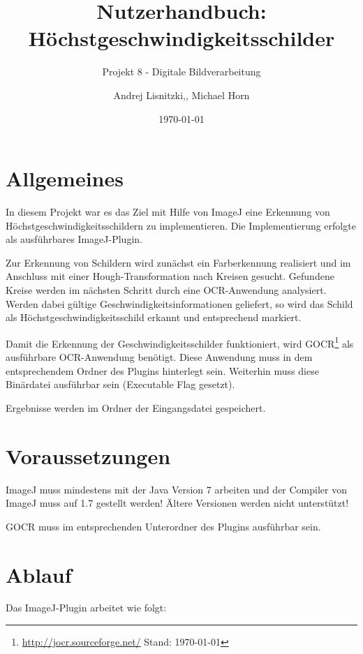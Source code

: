 						

\title{Nutzerhandbuch:  Höchstgeschwindigkeitsschilder}
\subtitle{Projekt 8 - Digitale Bildverarbeitung}

\author{Andrej Lisnitzki,, Michael Horn\vspace{4cm}}
\date{\today}

\maketitle

\section{Allgemeines}
In diesem Projekt war es das Ziel mit Hilfe von ImageJ eine Erkennung von Höchstgeschwindigkeitsschildern zu implementieren.
Die Implementierung erfolgte als ausführbares ImageJ-Plugin.

Zur Erkennung von Schildern wird zunächst ein Farberkennung realisiert und im Anschluss mit einer Hough-Transformation nach Kreisen gesucht.
Gefundene Kreise werden im nächsten Schritt durch eine OCR-Anwendung analysiert.
Werden dabei gültige Geschwindigkeitsinformationen geliefert, so wird das Schild als Höchstgeschwindigkeitsschild erkannt und entsprechend markiert.

Damit die Erkennung der Geschwindigkeitsschilder funktioniert, wird GOCR\footnote{\url{http://jocr.sourceforge.net/} Stand: \today} als ausführbare OCR-Anwendung benötigt.
Diese Anwendung muss in dem entsprechendem Ordner des Plugins hinterlegt sein.
Weiterhin muss diese Binärdatei ausführbar sein (Executable Flag gesetzt).

Ergebnisse werden im Ordner der Eingangsdatei gespeichert.

\pagebreak
\section{Voraussetzungen}
ImageJ muss mindestens mit der Java Version 7 arbeiten und der Compiler von ImageJ muss auf 1.7 gestellt werden!
Ältere Versionen werden nicht unterstützt!

GOCR muss im entsprechenden Unterordner des Plugins ausführbar sein.

\section{Ablauf}
Das ImageJ-Plugin arbeitet wie folgt:


